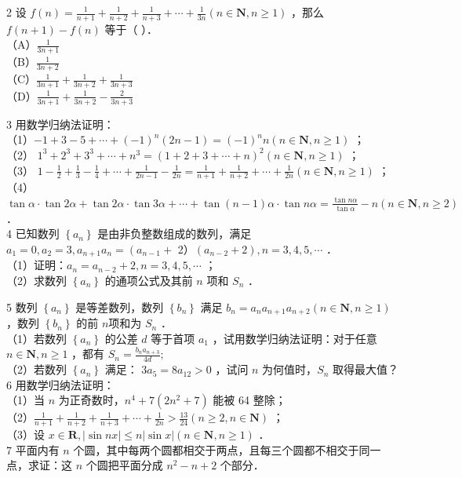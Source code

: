 \documentclass[10pt]{article}
\begin{document}
2 设 \(f(n)=\frac{1}{n+1}+\frac{1}{n+2}+\frac{1}{n+3}+\cdots+\frac{1}{3 n}(n \in \mathbf{N}, n \geqslant 1)\) ，那么 \(f(n+1)-f(n)\) 等于（ ）．\\
（A）\(\frac{1}{3 n+1}\)\\
（B）\(\frac{1}{3 n+2}\)\\
（C）\(\frac{1}{3 n+1}+\frac{1}{3 n+2}+\frac{1}{3 n+3}\)\\
（D）\(\frac{1}{3 n+1}+\frac{1}{3 n+2}-\frac{2}{3 n+3}\)

3 用数学归纳法证明：\\
（1）\(-1+3-5+\cdots+(-1)^{n}(2 n-1)=(-1)^{n} n(n \in \mathbf{N}, n \geqslant 1)\) ；\\
（2） \(1^{3}+2^{3}+3^{3}+\cdots+n^{3}=(1+2+3+\cdots+n)^{2}(n \in \mathbf{N}, n \geqslant 1)\) ；\\
（3） \(1-\frac{1}{2}+\frac{1}{3}-\frac{1}{4}+\cdots+\frac{1}{2 n-1}-\frac{1}{2 n}=\frac{1}{n+1}+\frac{1}{n+2}+\cdots+\frac{1}{2 n}(n \in \mathbf{N}, n \geqslant 1)\) ；\\
（4） \(\tan \alpha \cdot \tan 2 \alpha+\tan 2 \alpha \cdot \tan 3 \alpha+\cdots+\tan (n-1) \alpha \cdot \tan n \alpha=\frac{\tan n \alpha}{\tan \alpha}-n(n \in \mathbf{N}, n \geqslant 2)\) ．\\
4 已知数列 \(\left\{a_{n}\right\}\) 是由非负整数组成的数列，满足 \(a_{1}=0, a_{2}=3, a_{n+1} a_{n}=\left(a_{n-1}+\right.\) 2）\(\left(a_{n-2}+2\right), n=3,4,5, \cdots\) ．\\
（1）证明：\(a_{n}=a_{n-2}+2, n=3,4,5, \cdots\) ；\\
（2）求数列 \(\left\{a_{n}\right\}\) 的通项公式及其前 \(n\) 项和 \(S_{n}\) ．

5 数列 \(\left\{a_{n}\right\}\) 是等差数列，数列 \(\left\{b_{n}\right\}\) 满足 \(b_{n}=a_{n} a_{n+1} a_{n+2}(n \in \mathbf{N}, n \geqslant 1)\) ，数列 \(\left\{b_{n}\right\}\) 的前 \(n\)项和为 \(S_{n}\) ．\\
（1）若数列 \(\left\{a_{n}\right\}\) 的公差 \(d\) 等于首项 \(a_{1}\) ，试用数学归纳法证明：对于任意 \(n \in \mathbf{N}, n \geqslant 1\) ，都有 \(S_{n}=\frac{b_{n} a_{n+3}}{4 d} ;\)\\
（2）若数列 \(\left\{a_{n}\right\}\) 满足： \(3 a_{5}=8 a_{12}>0\) ，试问 \(n\) 为何值时，\(S_{n}\) 取得最大值？\\
6 用数学归纳法证明：\\
（1）当 \(n\) 为正奇数时，\(n^{4}+7\left(2 n^{2}+7\right)\) 能被 64 整除；\\
（2）\(\frac{1}{n+1}+\frac{1}{n+2}+\frac{1}{n+3}+\cdots+\frac{1}{2 n}>\frac{13}{24}(n \geqslant 2, n \in \mathbf{N})\) ；\\
（3）设 \(x \in \mathbf{R},|\sin n x| \leqslant n|\sin x|(n \in \mathbf{N}, n \geqslant 1)\) ．\\
7 平面内有 \(n\) 个圆，其中每两个圆都相交于两点，且每三个圆都不相交于同一点，求证：这 \(n\) 个圆把平面分成 \(n^{2}-n+2\) 个部分．
\end{document}
